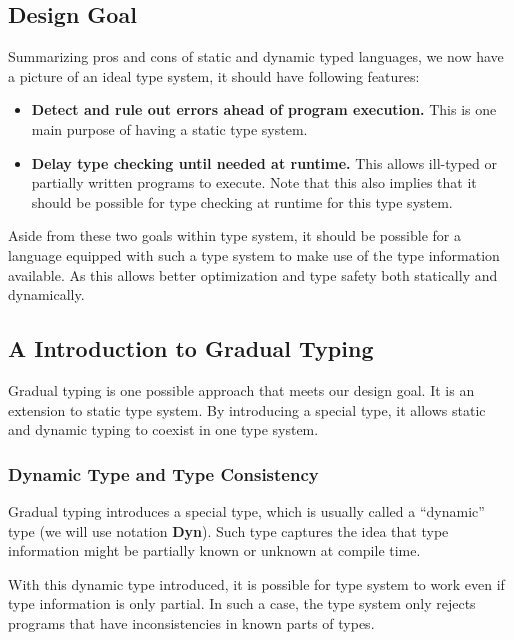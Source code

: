 \subsection{Design Goal}

Summarizing pros and cons of static and dynamic typed languages,
we now have a picture of an ideal type system, it should have following features:

\begin{itemize}
	\item \textbf{Detect and rule out errors ahead of program execution.} This is one main purpose of having a static type system.
	\item \textbf{Delay type checking until needed at runtime.}
	This allows ill-typed or partially written programs to execute.
	Note that this also implies that it should be possible for type checking
	at runtime for this type system.
\end{itemize}

Aside from these two goals within type system, it should be possible for a language equipped with such a type system to make use of the type information available.
As this allows better optimization and type safety both statically and dynamically.

\subsection{A Introduction to Gradual Typing}

\newcommand{\dyn}{\textbf{Dyn}}

Gradual typing is one possible approach that meets our design goal.
It is an extension to static type system.
By introducing a special type, it allows static and dynamic typing to coexist
in one type system.

\subsubsection{Dynamic Type and Type Consistency}

Gradual typing introduces a special type, which is usually called a ``dynamic'' type
(we will use notation \dyn).
Such type captures the idea that type information might be partially known or
unknown at compile time.

With this dynamic type introduced, it is possible for type system to work
even if type information is only partial. In such a case,
the type system only rejects programs that have inconsistencies in known parts of types.

